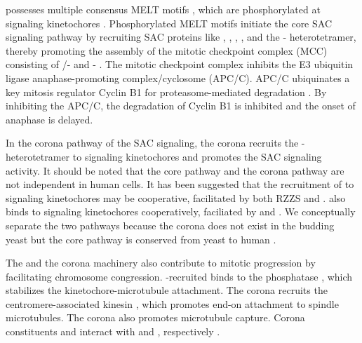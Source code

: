  possesses multiple consensus MELT motifs \cite{MELTEvolution}, which are phosphorylated at signaling kinetochores \cite{MPS1-KNL1_London2012, MPS1-KNL1_Shepperd2012, MPS1-KNL1_Yamagishi2012, MPS1Localization_Ji, MPS1Localization_Hiruma}. Phosphorylated MELT motifs initiate the core SAC signaling pathway by recruiting SAC proteins like , , , , and the - heterotetramer, thereby promoting the assembly of the mitotic checkpoint complex (MCC) consisting of /- and - \cite{RecombinantKNL1, MELTActivity, BubBiochem, BubR1TwoPools, BUB1CD1-MAD1CStructure, Faesen2017, BUB1-CDC20-MAD1, Tripartite, SpMCC}. The mitotic checkpoint complex inhibits the E3 ubiquitin ligase anaphase-promoting complex/cyclosome (APC/C). APC/C ubiquinates a key mitosis regulator Cyclin B1 for proteasome-mediated degradation \cite{SeparaseStructure}. By inhibiting the APC/C, the degradation of Cyclin B1 is inhibited and the onset of anaphase is delayed.

In the corona pathway of the SAC signaling, the corona recruits the - heterotetramer to signaling kinetochores and promotes the SAC signaling activity. It should be noted that the core pathway and the corona pathway are not independent in human cells. It has been suggested that the recruitment of  to signaling kinetochores may be cooperative, facilitated by both RZZS and  \cite{MIS12-CEP57-MAD1-MAD2, siROD_Zhang2019}.  also binds to signaling kinetochores cooperatively, faciliated by  and  \cite{BUB1-CDC20-MAD1, Tripartite}. We conceptually separate the two pathways because the corona does not exist in the budding yeast but the core pathway is conserved from yeast to human \cite{YeastNoRZZ}.

The  and the corona machinery also contribute to mitotic progression by facilitating chromosome congression. -recruited  binds to the phosphatase , which stabilizes the kinetochore-microtubule attachment. The corona recruits the centromere-associated kinesin , which promotes end-on attachment to spindle microtubules. The corona also promotes microtubule capture. Corona constituents  and  interact with  and , respectively \cite{CENPELocalization-BUBR1, CENP-FLimitsStripping}.